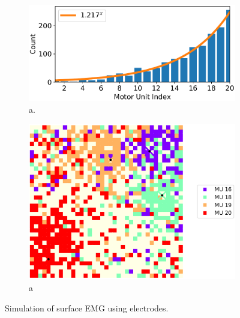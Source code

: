 \begin{figure}
  \centering%
  \begin{subfigure}[t]{0.45\textwidth}%
    \centering%
    \includegraphics[width=\textwidth]{images/results/application/oldmus2.pdf}%
    \caption{a.}%
    \label{fig:oldmus_progression}%
  \end{subfigure}\hfill
  \begin{subfigure}[t]{0.45\textwidth}%
    \centering%
    \includegraphics[width=\textwidth]{images/results/application/oldmus1.pdf}%
    \caption{a}%
    \label{fig:oldmus_2d}%
  \end{subfigure}
  \caption{Simulation of surface EMG using electrodes.}%
  \label{fig:oldmus}%
\end{figure}

